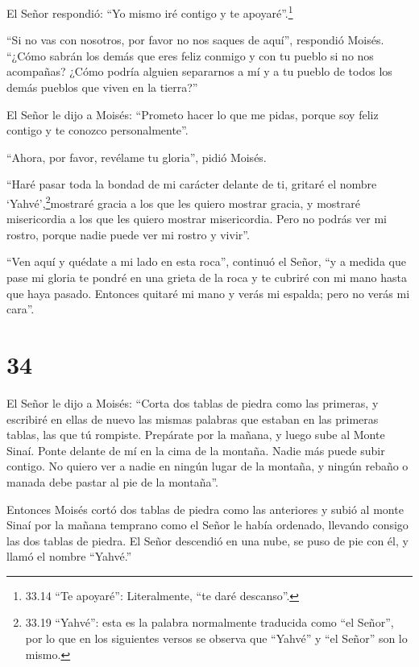  El Señor respondió: ``Yo mismo iré contigo y te
apoyaré''.\footnote{33.14 ``Te apoyaré'': Literalmente, ``te daré
  descanso''.}

 ``Si no vas con nosotros, por favor no nos saques de
aquí'', respondió Moisés.  ``¿Cómo sabrán los demás que
eres feliz conmigo y con tu pueblo si no nos acompañas? ¿Cómo podría
alguien separarnos a mí y a tu pueblo de todos los demás pueblos que
viven en la tierra?''

 El Señor le dijo a Moisés: ``Prometo hacer lo que me
pidas, porque soy feliz contigo y te conozco personalmente''.

 ``Ahora, por favor, revélame tu gloria'', pidió Moisés.

 ``Haré pasar toda la bondad de mi carácter delante de ti,
gritaré el nombre `Yahvé',\footnote{33.19 ``Yahvé'': esta es la palabra
  normalmente traducida como ``el Señor'', por lo que en los siguientes
  versos se observa que ``Yahvé'' y ``el Señor'' son lo mismo.}mostraré
gracia a los que les quiero mostrar gracia, y mostraré misericordia a
los que les quiero mostrar misericordia.  Pero no podrás
ver mi rostro, porque nadie puede ver mi rostro y vivir''.

 ``Ven aquí y quédate a mi lado en esta roca'', continuó el
Señor,  ``y a medida que pase mi gloria te pondré en una
grieta de la roca y te cubriré con mi mano hasta que haya pasado.
 Entonces quitaré mi mano y verás mi espalda; pero no verás
mi cara''.

\hypertarget{section-33}{%
\section{34}\label{section-33}}

 El Señor le dijo a Moisés: ``Corta dos tablas de piedra
como las primeras, y escribiré en ellas de nuevo las mismas palabras que
estaban en las primeras tablas, las que tú rompiste. 
Prepárate por la mañana, y luego sube al Monte Sinaí. Ponte delante de
mí en la cima de la montaña.  Nadie más puede subir contigo.
No quiero ver a nadie en ningún lugar de la montaña, y ningún rebaño o
manada debe pastar al pie de la montaña''.

 Entonces Moisés cortó dos tablas de piedra como las
anteriores y subió al monte Sinaí por la mañana temprano como el Señor
le había ordenado, llevando consigo las dos tablas de piedra.
 El Señor descendió en una nube, se puso de pie con él, y
llamó el nombre ``Yahvé.''

